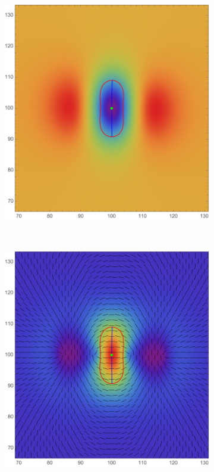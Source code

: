 \documentclass[a4paper, 11pt]{article}
\begin{document}
\begin{figure}
\centering
\begin{subfigure}[b]{0.32\textwidth}
\includegraphics[width=\textwidth]{Cusp_mean_Phi}
\end{subfigure}~
\begin{subfigure}[b]{0.32\textwidth}
\includegraphics[width=\textwidth]{Cusp_mean_L}

\end{subfigure}
\end{figure}
\end{document}
